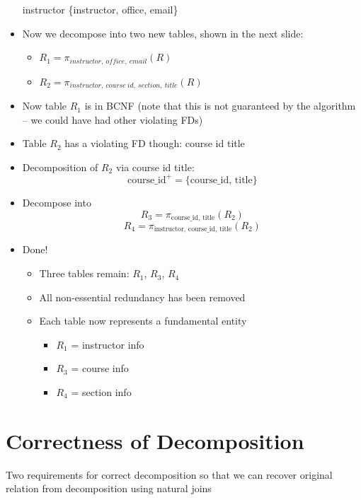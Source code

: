 \documentclass{../cheatsheet}
\begin{document}
\begin{multicols*}{2}
\begin{itemize}
            \begin{center}
                instructor \textrightarrow \{instructor, office, email\}
            \end{center}
        \item Now we decompose into two new tables, shown in the next slide:
            \begin{itemize}
                \item $R_1 = \pi_{instructor,\ office,\ email}(R)$
                \item $R_2 = \pi_{instructor,\ course\ id,\ section,\ title}(R)$
            \end{itemize}
        \item Now table $R_1$ is in BCNF (note that this is not guaranteed by the
            algorithm -- we could have had other violating FDs)
        \item Table $R_2$ has a violating FD though: course id \textrightarrow title
        \item Decomposition of $R_2$ via course id \textrightarrow title:
            \[\text{course\_id}^+ = \{\text{course\_id, title}\}\]
        \item Decompose into
            \[R_3 = \pi_{\text{course\_id, title}}(R_2)\]
            \[R_4 = \pi_{\text{instructor, course\_id, title}}(R_2)\]
        \item Done!
            \begin{itemize}
                \item Three tables remain: $R_1$, $R_3$, $R_4$
                \item All non-essential redundancy has been removed
                \item Each table now represents a fundamental entity
                    \begin{itemize}
                        \item $R_1$ = instructor info
                        \item $R_3$ = course info
                        \item $R_4$ = section info
                    \end{itemize}
            \end{itemize}
    \end{itemize}

    \section{Correctness of Decomposition}
    Two requirements for correct decomposition so that we can recover original
    relation from decomposition using natural joins


\end{multicols*}
\end{document}
